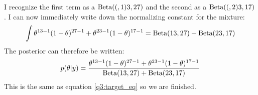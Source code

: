 I recognize the first term as a $\text{Beta}((, 1)3, 27)$ and the second as a $\text{Beta}((, 2)3, 17)$. 
I can now immediately write down the normalizing constant for the mixture:
\begin{align*}
                    \int\theta^{13-1}(1-\theta)^{27-1}
                 +
                    \theta^{23-1}(1-\theta)^{17-1}
                    =
            \text{Beta}(13, 27) + \text{Beta}(23, 17)\\
\end{align*}
The posterior can therefore be written:
\begin{align*}
                p(\theta\vert y)
                =\frac{
                    \theta^{13-1}(1-\theta)^{27-1} +\theta^{23-1}(1-\theta)^{17-1}
                }
                {
                    \text{Beta}(13, 27) + \text{Beta}(23, 17)
                }\\
\end{align*}
This is the same as equation \ref{q3:target_eq} so we are finished.




